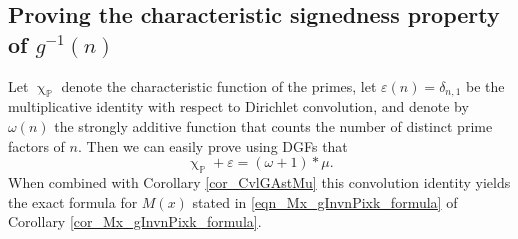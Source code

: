 \documentclass[11pt,reqno,a4letter]{article}
\numberwithin{figure}{section}
\numberwithin{table}{section}
\renewcommand{\chi}{\upchi}
\theoremstyle{plain}
\numberwithin{theorem}{section}
\theoremstyle{definition}
\begin{document}
\subsection{Proving the characteristic signedness property of $g^{-1}(n)$} 

Let $\chi_{\mathbb{P}}$ denote the characteristic function of the primes, let 
$\varepsilon(n) = \delta_{n,1}$ be the multiplicative identity with respect to Dirichlet convolution, 
and denote by $\omega(n)$ the strongly additive function that counts the number of 
distinct prime factors of $n$. Then we can easily prove using DGFs that 
\begin{equation}
\label{eqn_AntiqueDivisorSumIdent} 
\chi_{\mathbb{P}} + \varepsilon = (\omega + 1) \ast \mu. 
\end{equation} 
When combined with Corollary \ref{cor_CvlGAstMu} 
this convolution identity yields the exact 
formula for $M(x)$ stated in \eqref{eqn_Mx_gInvnPixk_formula} of 
Corollary \ref{cor_Mx_gInvnPixk_formula}. 
\end{document}
